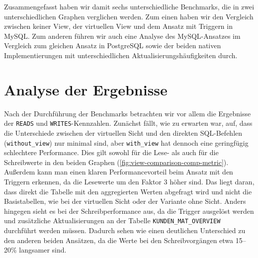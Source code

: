 Zusammengefasst haben wir damit sechs unterschiedliche Benchmarks, die in zwei unterschiedlichen Graphen verglichen werden.
Zum einen haben wir den Vergleich zwischen keiner View, der virtuellen View und dem Ansatz mit Triggern in MySQL\@.
Zum anderen führen wir auch eine Analyse des MySQL-Ansatzes im Vergleich zum gleichen Ansatz in PostgreSQL sowie der beiden nativen Implementierungen mit unterschiedlichen Aktualisierungshäufigkeiten durch.

\newpage
\section{Analyse der Ergebnisse}\label{sec:analyse-der-ergebnisse}

Nach der Durchführung der Benchmarks betrachten wir vor allem die Ergebnisse der \texttt{READS} und \texttt{WRITES}-Kennzahlen.
Zunächst fällt, wie zu erwarten war, auf, dass die Unterschiede zwischen der virtuellen Sicht und den direkten SQL-Befehlen (\texttt{without\_view}) nur minimal sind, aber \texttt{with\_view} hat dennoch eine geringfügig schlechtere Performance.
Dies gilt sowohl für die Lese- als auch für die Schreibwerte in den beiden Graphen (\ref{fig:view-comparison-comp-metric}).
Außerdem kann man einen klaren Performancevorteil beim Ansatz mit den Triggern erkennen, da die Lesewerte um den Faktor 3 höher sind.
Das liegt daran, dass direkt die Tabelle mit den aggregierten Werten abgefragt wird und nicht die Basistabellen, wie bei der virtuellen Sicht oder der Variante ohne Sicht.
Anders hingegen sieht es bei der Schreibperformance aus, da die Trigger ausgelöst werden und zusätzliche Aktualisierungen an der Tabelle \texttt{KUNDEN\_MAT\_OVERVIEW} durchführt werden müssen.
Dadurch sehen wie einen deutlichen Unterschied zu den anderen beiden Ansätzen, da die Werte bei den Schreibvorgängen etwa 15--20\% langsamer sind.

